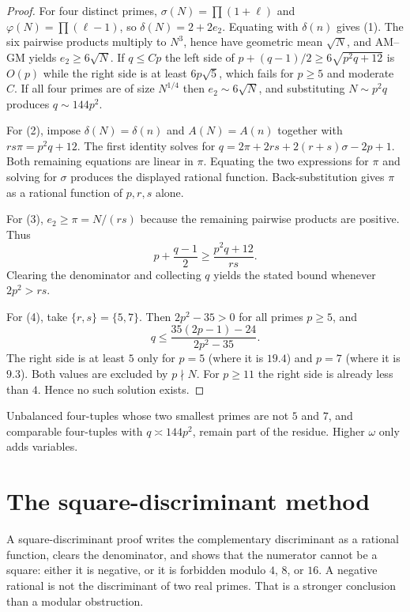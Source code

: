 \documentclass[11pt,reqno]{amsart}
\newcommand{\ph}{\varphi}
\newcommand{\sig}{\sigma}
\newcommand{\TT}{\delta}
\newcommand{\A}{A}
\theoremstyle{definition}
\begin{document}
\begin{proof}
For four distinct primes, \(\sig(N)=\prod(1+\ell)\) and \(\ph(N)=\prod(\ell-1)\), so
\(\TT(N)=2+2e_2\). Equating with \(\TT(n)\) gives (1). The six pairwise products multiply to \(N^3\), hence have geometric mean \(\sqrt{N}\), and AM--GM yields \(e_2\ge 6\sqrt{N}\). If \(q\le Cp\) the left side of \(p+(q-1)/2\ge 6\sqrt{p^2q+12}\) is \(O(p)\) while the right side is at least \(6p\sqrt{5}\), which fails for \(p\ge 5\) and moderate \(C\). If all four primes are of size \(N^{1/4}\) then \(e_2\sim 6\sqrt{N}\), and substituting \(N\sim p^2q\) produces \(q\sim 144p^2\).

For (2), impose \(\TT(N)=\TT(n)\) and \(\A(N)=\A(n)\) together with \(rs\pi=p^2q+12\). The first identity solves for \(q=2\pi+2rs+2(r+s)\sigma-2p+1\). Both remaining equations are linear in \(\pi\). Equating the two expressions for \(\pi\) and solving for \(\sigma\) produces the displayed rational function. Back-substitution gives \(\pi\) as a rational function of \(p,r,s\) alone.

For (3), \(e_2\ge\pi=N/(rs)\) because the remaining pairwise products are positive. Thus
\[
p+\frac{q-1}{2}\ge\frac{p^2q+12}{rs}.
\]
Clearing the denominator and collecting \(q\) yields the stated bound whenever \(2p^2>rs\).

For (4), take \(\{r,s\}=\{5,7\}\). Then \(2p^2-35>0\) for all primes \(p\ge 5\), and
\[
q\le\frac{35(2p-1)-24}{2p^2-35}.
\]
The right side is at least \(5\) only for \(p=5\) (where it is \(19.4\)) and \(p=7\) (where it is \(9.3\)). Both values are excluded by \(p\nmid N\). For \(p\ge 11\) the right side is already less than \(4\). Hence no such solution exists.
\end{proof}

Unbalanced four-tuples whose two smallest primes are not \(5\) and \(7\), and comparable four-tuples with \(q\asymp 144p^2\), remain part of the residue. Higher \(\omega\) only adds variables.

\section{The square-discriminant method}
\label{sec:sqdisc}

A square-discriminant proof writes the complementary discriminant as a rational function, clears the denominator, and shows that the numerator cannot be a square: either it is negative, or it is forbidden modulo \(4\), \(8\), or \(16\). A negative rational is not the discriminant of two real primes. That is a stronger conclusion than a modular obstruction.
\end{document}
